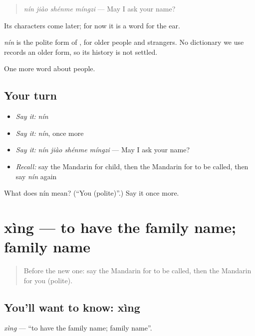 \begin{quote}
\emph{nín jiào shénme míngzi} — May I ask your name?
\end{quote}

Its characters come later; for now it is a word for the ear.

\begin{cousinweb}
\emph{nín} is the polite form of , for older people and strangers. No dictionary we use records an older form, so its history is not settled.
\end{cousinweb}

\begin{grammarlens}[title={What you've built}]
One more word about people.
\end{grammarlens}

\subsection*{Your turn}
\begin{itemize}
\raggedright
  \item \emph{Say it:} \emph{nín}
  \item \emph{Say it:} \emph{nín}, once more
  \item \emph{Say it:} \emph{nín jiào shénme míngzi} — May I ask your name?
  \item \emph{Recall:} say the Mandarin for child, then the Mandarin for to be called, then say \emph{nín} again
\end{itemize}

\begin{tcolorbox}[breakable,colback=teal!4,colframe=teal!35!black,title={Before you move on}]
What does nín mean? (\textquotedblleft{}You (polite)\textquotedblright{}.) Say it once more.
\end{tcolorbox}
\section[xìng]{xìng — to have the family name; family name}

\label{lesson:ZH-C34-xing}



\begin{quote}
Before the new one: say the Mandarin for to be called, then the Mandarin for you (polite).
\end{quote}

\subsection*{You'll want to know: xìng}
\emph{xìng} — \textquotedblleft{}to have the family name; family name\textquotedblright{}.

